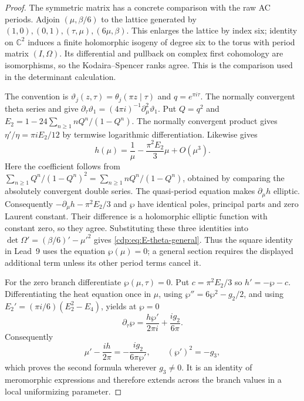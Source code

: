 \begin{proof}
The symmetric matrix has a concrete comparison with the raw AC
periods. Adjoin $(\mu,\beta/6)$ to the lattice generated by
$(1,0),(0,1),(\tau,\mu),(6\mu,\beta)$. This enlarges the
lattice by index six; identity on $\mathbb C^2$ induces a finite
holomorphic isogeny of degree six to the torus with period matrix
$(I,\Omega)$. Its differential and pullback on complex first
cohomology are isomorphisms, so the Kodaira--Spencer ranks agree.
This is the comparison used in the determinant calculation.

The convention is
$\vartheta_j(z,\tau)=\theta_j(\pi z\mid\tau)$ and
$q=e^{\pi i\tau}$. The normally convergent theta series and
\cite[eqs.~20.2.1 and 20.13.1]{DLMFTheta2026} give
$\partial_\tau\vartheta_1=(4\pi i)^{-1}\partial_\mu^2\vartheta_1$.
Put $Q=q^2$ and
$E_2=1-24\sum_{n\ge1}nQ^n/(1-Q^n)$.
The normally convergent product
\cite[eq.~23.17.8]{DLMFTheta2026} gives
$\eta'/\eta=\pi i E_2/12$ by termwise logarithmic differentiation.
Likewise \cite[eq.~20.5.1]{DLMFTheta2026} gives
\[
 h(\mu)=\frac1\mu-\frac{\pi^2E_2}{3}\mu+O(\mu^3).
\]
Here the coefficient follows from
$\sum_{n\ge1}Q^n/(1-Q^n)^2
=\sum_{n\ge1}nQ^n/(1-Q^n)$, obtained by comparing the absolutely
convergent double series. The quasi-period equation
\cite[eq.~20.2.6]{DLMFTheta2026} makes $\partial_\mu h$ elliptic.
Consequently $-\partial_\mu h-\pi^2E_2/3$ and $\wp$
have identical poles, principal parts and zero Laurent constant.
Their difference is a holomorphic elliptic function with constant
zero, so they agree. Substituting these three
identities into
$\det\Omega'=(\beta/6)'-\mu'^2$ gives
\eqref{cdp:eq:E-theta-general}. Thus the square identity in Lead~9
uses the equation $\wp(\mu)=0$; a general section requires the
displayed additional term unless its other period terms cancel it.

For the zero branch differentiate $\wp(\mu,\tau)=0$. Put
$c=\pi^2E_2/3$ so $h'=-\wp-c$. Differentiating the heat equation
once in $\mu$, using $\wp''=6\wp^2-g_2/2$, and using
$E_2'=(\pi i/6)(E_2^2-E_4)$, yields at $\wp=0$
\[
 \partial_\tau\wp=\frac{h\wp'}{2\pi i}
                       +\frac{i g_2}{6\pi}.
\]
Consequently
\[
 \mu'-\frac{i h}{2\pi}=-\frac{i g_2}{6\pi\wp'},
 \qquad (\wp')^2=-g_3,
\]
which proves the second formula wherever $g_3\ne0$. It is an
identity of meromorphic expressions and therefore extends across
the branch values in a local uniformizing parameter.


\end{proof}
